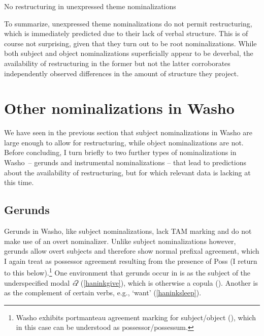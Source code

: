\documentclass[output=paper]{langscibook}
\begin{document}
\ea No restructuring in unexpressed theme nominalizations\label{haninknor}
\z
\z
 
To summarize, unexpressed theme nominalizations do not permit restructuring, which is immediately predicted due to their lack of verbal structure. This is of course not surprising, given that they turn out to be root nominalizations. While both subject and object nominalizations superficially appear to be deverbal, the availability of restructuring in the former but not the latter corroborates independently observed differences in the amount of structure they project.

\section{Other nominalizations in Washo} \label{haninksec:4}

We have seen in the previous section that subject nominalizations in Washo are large enough to allow for restructuring, while object nominalizations are not. Before concluding, I turn briefly to two further types of nominalizations in Washo~-- gerunds and instrumental nominalizations -- that lead to predictions about the availability of restructuring, but for which relevant data is lacking at this time.

\subsection{Gerunds}\largerpage

Gerunds in Washo, like subject nominalizations,  lack TAM marking and do not make use of an overt nominalizer. Unlike subject nominalizations however, gerunds allow overt subjects and therefore show normal prefixal agreement, which I again treat as possessor agreement resulting from the presence of Poss (I return to this below).\footnote{Washo exhibits portmanteau agreement marking for subject/object (\citealt{jacobsen1964}), which in this case can be understood as possessor/possessum.} One  environment that gerunds occur in is as the subject of the underspecified modal {\itshape éʔ} (\ref{haninkgive}), which is otherwise a copula (\citealt{bochnak2015wscla,bochnak2015nels}). Another is as the  complement of certain  verbs, e.g., `want' (\ref{haninksleep}).
 
\end{document}
